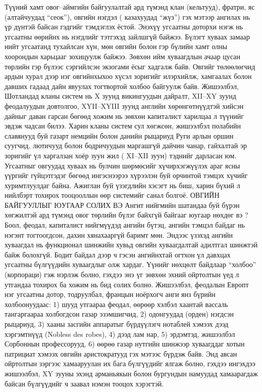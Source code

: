 Түүний хамт овог–аймгийн байгуулалтай ард түмэнд клан (кельтууд), фратри, яс (алтайчуудад “сеок”), овгийн нэгдэл ( казахуудад “жүз”) гэх мэтээр ангилах нь үр дүнтэй байсан гэдгийг тэмдэглэх ёстой. Энэхүү угсаатны доторхи нэгж нь угсаатны өөрийнх нь нэгдлийг тэтгэхэд зайлшгүй байжээ. Бүлэгт хуваах замаар нийт угсаатанд тухайлсан хүн, мөн овгийн болон гэр бүлийн хамт олны хоорондын харьцааг зохицуулж байжээ. Зөвхөн ийм хуваагдлын ачаар цусан төрлийн гэр бүлээс сэргийлсэн экзогами ёсыг хадгалж байв. Овгийг төлөөлөгчид ардын хурал дээр нэг овгийнхыхоо хүсэл зоригийг илэрхийлж, хамгаалах болон давших гадаад дайн явуулах тогтвортой холбоо байгуулж байв. Жишээлбэл, Шотландад кланы систем нь X зуунд викингуудын дайралт, XII–XY зуунд феодалуудын довтолгоо, XYII–XYIII зуунд английн хөрөнгөтнүүдтэй хийсэн дайныг даван гарсан бөгөөд хожим нь зөвхөн капиталист харилцаа л түүнийг эвдэж чадсан билээ. Харин кланы систем сул хөгжсөн, жишээлбэл полабийн славянууд буй газарт немцийн болон данийн рыцариуд Руги арлын оршин суугчид, лютичууд болон бодричуудын маргашгүй дайчин чанар, гайхалтай эр зоригийг үл харгалзан хоёр зуун жил ( XI–XII зуун) тэднийг дарласан юм. Угсаатныг овгуудад хуваах нь булчин шөрмөсийг хүчирхэгжүүлэх араг ясны үүргийг гүйцэтгэдэг бөгөөд ингэснээрээ хүрээлэн буй орчинтой тэмцэх хүчийг хуримтлуулдаг байна.
Ажиглан буй үзэгдлийн хэсэгт нь биш, харин бүхий л нийлбэрт тохирох тооцооллын өөр системийг санал болгоё.
ОВГИЙН БАЙГУУЛЛЫГ ЮУГААР СОЛИХ ВЭ
Ангит нийгмийн шатандаа буй бүрэн хөгжилтэй ард түмэнд овог төрлийн бүлэг байхгүй байгааг юугаар нөхдөг вэ ? Боол, феодал, капиталист нийгмүүдэд ангийн бүтэц, ангийн тэмцэл байдаг нь нэгэнт тогтоогдсон, дахин хянахааргүй баримт мөн. Эндээс үзэхэд ангийн хуваагдал нь функционал шинжийн хувьд овгийн хуваагдалтай адилтгал шинжтэй байж болохгүй. Бодит байдал дээр ч гэсэн ангийнхтай огтхон үл давхцах угсаатны бүлгүүдийн хуваагдлыг олж хардаг. Үүнийг нөхцөлт байдлаар “холбоо” (корпораци) гэж нэрлэж болно, гэхдээ энэ үг зөвхөн эхний ойртолтын үед л утгандаа тохирох ба хожим нь бид солих болно.
Жишээлбэл, феодалын Европт нэг угсаатны дотор, тодруулбал, францын ноёрхогч анги янз бүрийн холбоонуудаас: 1) шууд утгаараа феодал, өөрөөр хэлбэл хаантай вассаль тангаргаараа холбогдсон газар эзэмшигчид, 2) одонгуудад (орден) нэгдсэн рыцариуд, 3) хааны засгийн аппаратыг бүрдүүлэгч нотаблей хэмээх дээд хэргэмтнүүд (Nobless des robes), 4) дээд лам нар, 5) эрдэмтэд, жишээлбэл Сорбоннын профессорууд, 6) өөрөө газар нутгийн шинжээр хуваагддаг хотын патрициат хэмээх овгийн аристократууд гэх мэтээс бүрдэж байв. Энд авсан ойртолтын зэргээс хамааруулан их бага бүлгүүдийг ялгаж болно, гэхдээ ингэхдээ жишээлбэл, XY зууны эхэнд арманьякын болон бургундын намуудад хамаарагдаж байсан бүлгүүдийг ч заавал нэмэн тооцох хэрэгтэй.
